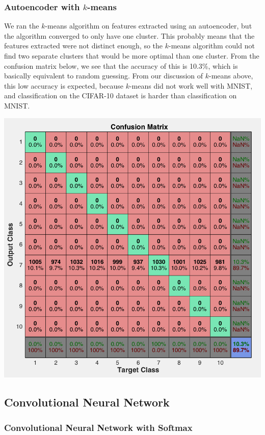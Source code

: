\documentclass[11pt]{article}
\begin{document}
\subsubsection{Autoencoder with $k$-means}
We ran the $k$-means algorithm on features extracted using an autoencoder, but the algorithm converged to only have one cluster. This probably means that the features extracted were not distinct enough, so the $k$-means algorithm could not find two separate clusters that would be more optimal than one cluster. From the confusion matrix below, we see that the accuracy of this is 10.3\%, which is basically equivalent to random guessing. From our discussion of $k$-means above, this low accuracy is expected, because $k$-means did not work well with MNIST, and classification on the CIFAR-10 dataset is harder than classification on MNIST.
\begin{center}
\includegraphics[scale=0.5]{autoencoder_kmeans.png}
\end{center}

\subsection{Convolutional Neural Network}
\subsubsection{Convolutional Neural Network with Softmax}
\end{document}
